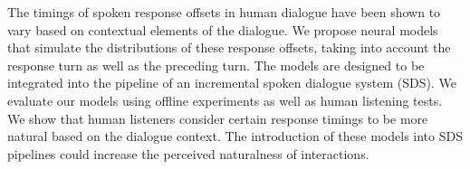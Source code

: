 The timings of spoken response offsets in human dialogue have been shown to vary based on contextual elements of the dialogue. We propose neural models that simulate the distributions of these response offsets, taking into account the response turn as well as the preceding turn. The models are designed to be integrated into the pipeline of an incremental spoken dialogue system (SDS). We evaluate our models using offline experiments as well as human listening tests. We show that human listeners consider certain response timings to be more natural based on the dialogue context. The introduction of these models into SDS pipelines could increase the perceived naturalness of interactions.
